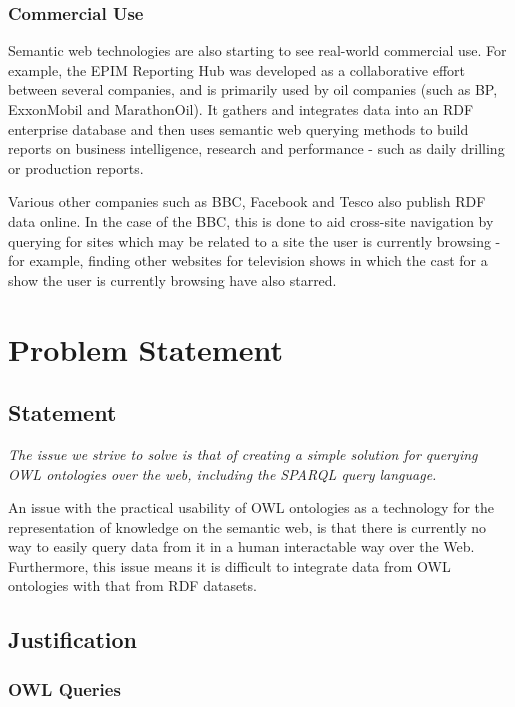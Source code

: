\documentclass{article}
\begin{document}
\subsubsection{Commercial Use}

Semantic web technologies are also starting to see real-world commercial use.
For example, the EPIM Reporting Hub was developed as a collaborative effort
between several companies, and is primarily used by oil companies (such as BP,
ExxonMobil and MarathonOil). It gathers and integrates data into an RDF enterprise 
database and then uses semantic web querying methods to build reports on business 
intelligence, research and performance - such as daily drilling or production
reports.

Various other companies such as BBC, Facebook and Tesco also publish RDF data
online. In the case of the BBC, this is done to aid cross-site navigation by
querying for sites which may be related to a site the user is currently browsing
- for example, finding other websites for television shows in which the cast for
a show the user is currently browsing have also
starred.\cite{bbcone}\cite{bbctwo}

\section{Problem Statement}

\subsection{Statement}

\emph{The issue we strive to solve is that of creating a simple solution for querying
OWL ontologies over the web, including the SPARQL query language.}

An issue with the practical usability of OWL ontologies as a technology for the
representation of knowledge on the semantic web, is that there is currently no
way to easily query data from it in a human interactable way over the Web.
Furthermore, this issue means it is difficult to integrate data from OWL
ontologies with that from RDF datasets. 

\subsection{Justification}

\subsubsection{OWL Queries}
\end{document}
